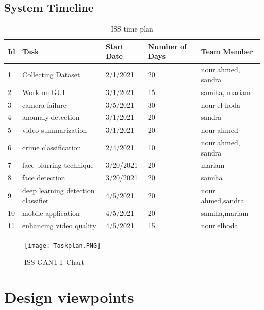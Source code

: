 \documentclass[12pt]{article}
\begin{document}
\subsection {System Timeline}

\begin{table}[htbp]
\centering
\caption{ISS time plan}
\label{tab:Time Plan}


\begin{tabular}{|l|l|l|l|l|}
\hline
Id & Task               & Start Date & Number of Days & Team Member \\ \hline
1  & Collecting Dataset    & 2/1/2021 & 20           & nour ahmed, sandra        \\ \hline
2  & Work on GUI        & 3/1/2021 & 15             & samiha, mariam        \\ \hline
3  & camera failure    & 3/5/2021 & 30              & nour el hoda          \\ \hline
4  &  anomaly detection & 3/1/2021 &20             & sandra    \\ \hline
5  & video summarization     & 3/1/2021 & 20             & nour ahmed           \\ \hline

6 & crime classification     & 2/4/2021 & 10    & nour ahmed, sandra          \\ \hline
7 &   face blurring technique  & 3/20/2021 & 20             & mariam     \\ \hline
8 &   face detection    & 3/20/2021 & 20             & samiha    \\ \hline
9 &  deep learning detection classifier    & 4/5/2021 & 20             & nour ahmed,sandra    \\ \hline
10 & mobile application    & 4/5/2021 & 20             & samiha,mariam    \\ \hline
11 & enhancing video quality   & 4/5/2021 & 15             & nour elhoda          \\ \hline

\hline
\end{tabular}
\end{table}

\begin{figure}[htbp]
\centering
\texttt{[image: Taskplan.PNG]}
\caption{ISS GANTT Chart}
\label{fig:GANTT Chart}
\end{figure}

\clearpage
\section{Design viewpoints} 
\end{document}
